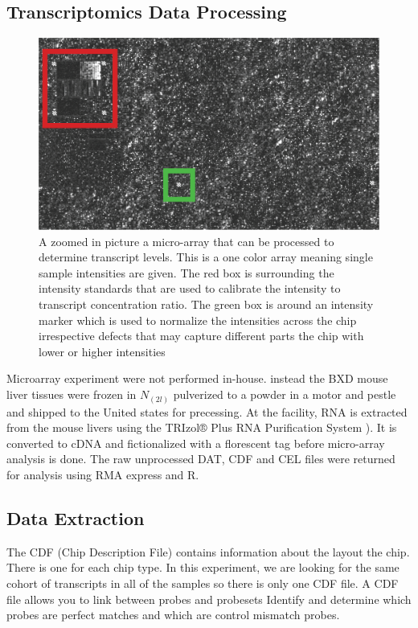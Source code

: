 \documentclass[a4paper,11pt,twoside]{book}
\begin{document}
	\subsection{Transcriptomics Data Processing}
	\begin{figure}
		\includegraphics[width = 1.0\linewidth]{3.Trancriptomics/Affimetrix_Chip_ZoomIn.png}
		\caption{A zoomed in picture a micro-array that can be processed to determine transcript levels. This is a one color array meaning single sample intensities are given. The red box is surrounding the intensity standards that are used to calibrate the intensity to transcript concentration ratio. The green box is around an intensity marker which is used to normalize the intensities across the chip irrespective defects that may capture different parts the chip with lower or higher intensities}
		\label{fig: Zoomed-in Photograph of a Microarray}
	\end{figure}
	
	Microarray experiment were not performed in-house. instead the BXD mouse liver tissues were frozen in $N_(2l)$ pulverized to a powder in a motor and pestle and shipped to the United states for precessing. At the facility, RNA is extracted from the mouse livers using the TRIzol® Plus RNA Purification System \citep{Rio2010TRIzol}). It is converted to cDNA and fictionalized with a florescent tag before micro-array analysis is done. The raw unprocessed DAT, CDF and CEL files were returned for analysis using RMA express and R.
	
	
	\subsection{Data Extraction} 
	
	The CDF (Chip Description File) contains information about the layout the chip. There is one for each chip type. In this experiment, we are looking for the same cohort of transcripts in all of the samples so there is only one CDF file. A CDF file allows you to link between probes and probesets Identify and determine which probes are perfect matches and which are control mismatch probes\citep{Miller2009MicroArrays}.
	
\end{document}
